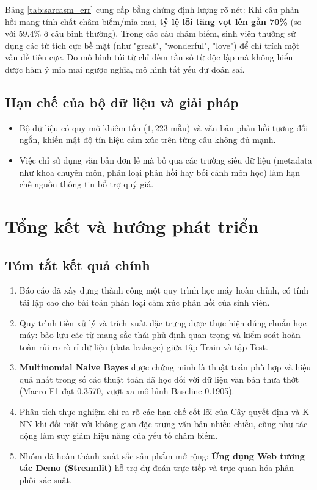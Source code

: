 \documentclass[12pt,a4paper]{article}
\begin{document}
Bảng \ref{tab:sarcasm_err} cung cấp bằng chứng định lượng rõ nét: Khi câu phản hồi mang tính chất châm biếm/mỉa mai, \textbf{tỷ lệ lỗi tăng vọt lên gần 70\%} (so với 59.4\% ở câu bình thường). Trong các câu châm biếm, sinh viên thường sử dụng các từ tích cực bề mặt (như "great", "wonderful", "love") để chỉ trích một vấn đề tiêu cực. Do mô hình túi từ chỉ đếm tần số từ độc lập mà không hiểu được hàm ý mỉa mai ngược nghĩa, mô hình tất yếu dự đoán sai.

\subsection{Hạn chế của bộ dữ liệu và giải pháp}
\begin{itemize}
    \item Bộ dữ liệu có quy mô khiêm tốn ($1,223$ mẫu) và văn bản phản hồi tương đối ngắn, khiến mật độ tín hiệu cảm xúc trên từng câu không đủ mạnh.
    \item Việc chỉ sử dụng văn bản đơn lẻ mà bỏ qua các trường siêu dữ liệu (metadata như khoa chuyên môn, phân loại phản hồi hay bối cảnh môn học) làm hạn chế nguồn thông tin bổ trợ quý giá.
\end{itemize}

\newpage
\section{Tổng kết và hướng phát triển}

\subsection{Tóm tắt kết quả chính}
\begin{enumerate}
    \item Báo cáo đã xây dựng thành công một quy trình học máy hoàn chỉnh, có tính tái lập cao cho bài toán phân loại cảm xúc phản hồi của sinh viên.
    \item Quy trình tiền xử lý và trích xuất đặc trưng được thực hiện đúng chuẩn học máy: bảo lưu các từ mang sắc thái phủ định quan trọng và kiểm soát hoàn toàn rủi ro rò rỉ dữ liệu (data leakage) giữa tập Train và tập Test.
    \item \textbf{Multinomial Naive Bayes} được chứng minh là thuật toán phù hợp và hiệu quả nhất trong số các thuật toán đã học đối với dữ liệu văn bản thưa thớt (Macro-F1 đạt 0.3570, vượt xa mô hình Baseline 0.1905).
    \item Phân tích thực nghiệm chỉ ra rõ các hạn chế cốt lõi của Cây quyết định và K-NN khi đối mặt với không gian đặc trưng văn bản nhiều chiều, cũng như tác động làm suy giảm hiệu năng của yếu tố châm biếm.
    \item Nhóm đã hoàn thành xuất sắc sản phẩm mở rộng: \textbf{Ứng dụng Web tương tác Demo (Streamlit)} hỗ trợ dự đoán trực tiếp và trực quan hóa phân phối xác suất.
\end{enumerate}
\end{document}

